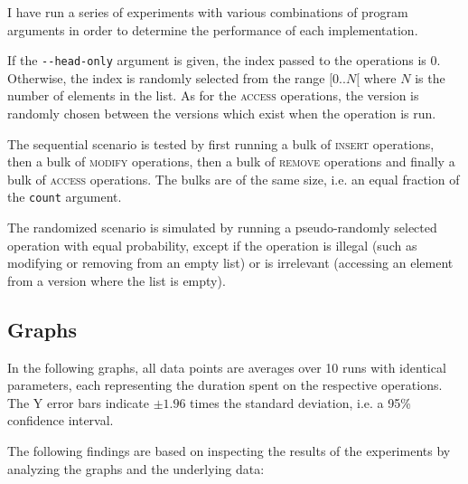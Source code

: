 I have run a series of experiments with various combinations of program
arguments in order to determine the performance of each implementation.

If the \texttt{-\@{}-head-only} argument is given, the index passed to
the operations is 0. Otherwise, the index is randomly selected from the range
$[0..N[$ where $N$ is the number of elements in the list. As for the
\textsc{access} operations, the version is randomly chosen between the versions
which exist when the operation is run.

The sequential scenario is tested by first running a bulk of \textsc{insert}
operations, then a bulk of \textsc{modify} operations, then a bulk of
\textsc{remove} operations and finally a bulk of \textsc{access} operations. The
bulks are of the same size, i.e. an equal fraction of the \texttt{count}
argument.

The randomized scenario is simulated by running a pseudo-randomly selected
operation with equal probability, except if the operation is illegal (such as
modifying or removing from an empty list) or is irrelevant (accessing an element
from a version where the list is empty).

\subsection{Graphs}

In the following graphs, all data points are averages over 10 runs with
identical parameters, each representing the duration spent on the respective
operations. The Y error bars indicate $\pm 1.96$ times the standard deviation,
i.e. a 95\% confidence interval.

The following findings are based on inspecting the results of the experiments by
analyzing the graphs and the underlying data:

